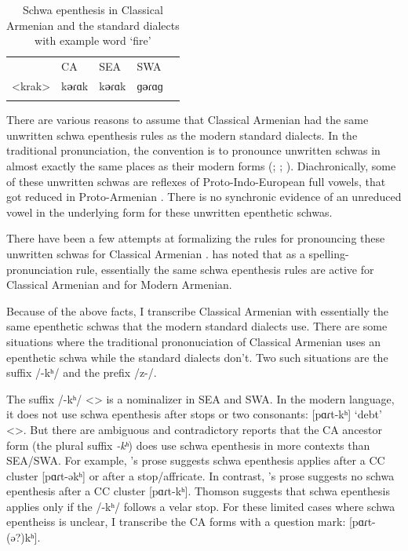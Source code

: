 \begin{table}[H]
	\caption{Schwa epenthesis in Classical Armenian and the standard dialects with example word `fire'} \label{tab:HossepIntro:schwaEpen}
	\centering 
	\begin{tabular}{ l  lll  l }
		\lsptoprule  	& CA & SEA & SWA & \\ \cmidrule(lr){2-4}	
		<krak> & k\textbf{ə}ɾɑk &k\textbf{ə}ɾɑk &ɡ\textbf{ə}ɾɑɡ & \armenian{կրակ}
		\\\lspbottomrule 
	\end{tabular}
\end{table}

There are various reasons to assume that Classical Armenian had the same unwritten schwa epenthesis rules as the modern standard dialects. In the traditional pronunciation, the convention is to pronounce unwritten schwas in almost exactly the same places as their modern forms (\citealt[16]{Godel-1975-IntroClassicalArmenian}; \citealt[116]{Thomson-1989-IntroClassicalArmenian}; \citealt[1043]{Macak-2017-PhonoClassicalArmenian}). Diachronically, some of these unwritten schwas are reflexes of Proto-Indo-European full vowels, that got reduced in Proto-Armenian \citep[26]{Vaux-1998-ArmenianPhono}. There is no synchronic evidence of an unreduced vowel in the underlying form for these unwritten epenthetic schwas.

There have been a few attempts at formalizing the rules for pronouncing these unwritten schwas for Classical Armenian \citep{Hammalian-1984-PhonoOldArmenian,Schwink-1994-ArmenianSchwaLexicalized,Pierce-2007-SchwaClassicalArmenian}. \citet{Pierce-2007-SchwaClassicalArmenian} has noted that as a spelling-pronunciation rule, essentially the same schwa epenthesis rules are active for Classical Armenian and for Modern Armenian.

Because of the above facts, I transcribe Classical Armenian with essentially the same epenthetic schwas that the modern standard dialects use. There are some situations where the traditional prononuciation of Classical Armenian   uses an epenthetic schwa while the standard dialects don't. Two such situations are the suffix /-kʰ/ and the prefix /z-/. 

The suffix /-kʰ/ <> is a nominalizer in SEA and SWA. In the modern language, it does not use schwa epenthesis after stops or two consonants: [pɑɾt-kʰ] `debt' <>. But there are ambiguous and contradictory reports that the CA ancestor form (the plural suffix \textit{-kʰ}) does use schwa epenthesis in more contexts than SEA/SWA. For example, \citet[18-19]{Godel-1975-IntroClassicalArmenian}'s prose suggests schwa epenthesis applies after a CC cluster [pɑɾt-əkʰ] or after a stop/affricate. In contrast, \citet[120]{Thomson-1989-IntroClassicalArmenian}'s prose suggests no schwa epenthesis after a CC cluster [pɑɾt-kʰ]. Thomson suggests that schwa epenthesis applies only if the /-kʰ/ follows a velar stop. For these limited cases where schwa epentheiss is unclear, I transcribe the CA forms with a question mark: [pɑɾt-(ə?)kʰ]. 

